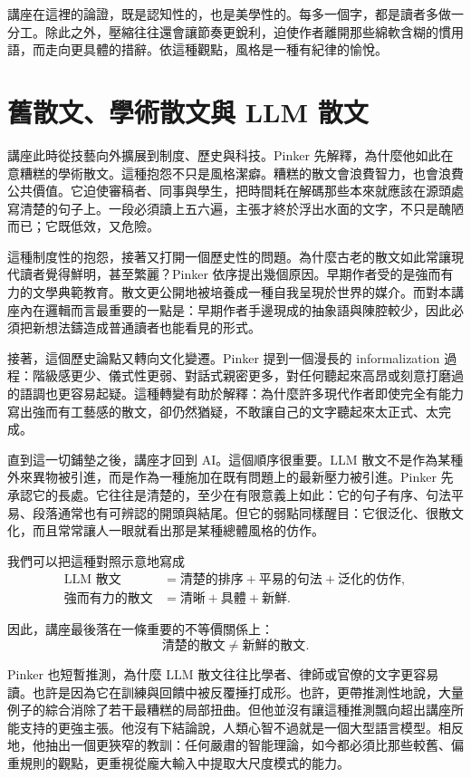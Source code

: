 講座在這裡的論證，既是認知性的，也是美學性的。每多一個字，都是讀者多做一分工。除此之外，壓縮往往還會讓節奏更銳利，迫使作者離開那些綿軟含糊的慣用語，而走向更具體的措辭。依這種觀點，風格是一種有紀律的愉悅。

\section{舊散文、學術散文與 LLM 散文}

講座此時從技藝向外擴展到制度、歷史與科技。Pinker 先解釋，為什麼他如此在意糟糕的學術散文。這種抱怨不只是風格潔癖。糟糕的散文會浪費智力，也會浪費公共價值。它迫使審稿者、同事與學生，把時間耗在解碼那些本來就應該在源頭處寫清楚的句子上。一段必須讀上五六遍，主張才終於浮出水面的文字，不只是醜陋而已；它既低效，又危險。

這種制度性的抱怨，接著又打開一個歷史性的問題。為什麼古老的散文如此常讓現代讀者覺得鮮明，甚至繁麗？Pinker 依序提出幾個原因。早期作者受的是強而有力的文學典範教育。散文更公開地被培養成一種自我呈現於世界的媒介。而對本講座內在邏輯而言最重要的一點是：早期作者手邊現成的抽象語與陳腔較少，因此必須把新想法鑄造成普通讀者也能看見的形式。

接著，這個歷史論點又轉向文化變遷。Pinker 提到一個漫長的 informalization 過程：階級感更少、儀式性更弱、對話式親密更多，對任何聽起來高昂或刻意打磨過的語調也更容易起疑。這種轉變有助於解釋：為什麼許多現代作者即使完全有能力寫出強而有工藝感的散文，卻仍然猶疑，不敢讓自己的文字聽起來太正式、太完成。

直到這一切鋪墊之後，講座才回到 AI。這個順序很重要。LLM 散文不是作為某種外來異物被引進，而是作為一種施加在既有問題上的最新壓力被引進。Pinker 先承認它的長處。它往往是清楚的，至少在有限意義上如此：它的句子有序、句法平易、段落通常也有可辨認的開頭與結尾。但它的弱點同樣醒目：它很泛化、很散文化，而且常常讓人一眼就看出那是某種總體風格的仿作。

我們可以把這種對照示意地寫成
\begin{align}
\text{LLM 散文} &= \text{清楚的排序} + \text{平易的句法} + \text{泛化的仿作}, \\
\text{強而有力的散文} &= \text{清晰} + \text{具體} + \text{新鮮}.
\end{align}

因此，講座最後落在一條重要的不等價關係上：
\begin{equation}
\text{清楚的散文} \neq \text{新鮮的散文}.
\end{equation}

Pinker 也短暫推測，為什麼 LLM 散文往往比學者、律師或官僚的文字更容易讀。也許是因為它在訓練與回饋中被反覆捶打成形。也許，更帶推測性地說，大量例子的綜合消除了若干最糟糕的局部扭曲。但他並沒有讓這種推測飄向超出講座所能支持的更強主張。他沒有下結論說，人類心智不過就是一個大型語言模型。相反地，他抽出一個更狹窄的教訓：任何嚴肅的智能理論，如今都必須比那些較舊、偏重規則的觀點，更重視從龐大輸入中提取大尺度模式的能力。

